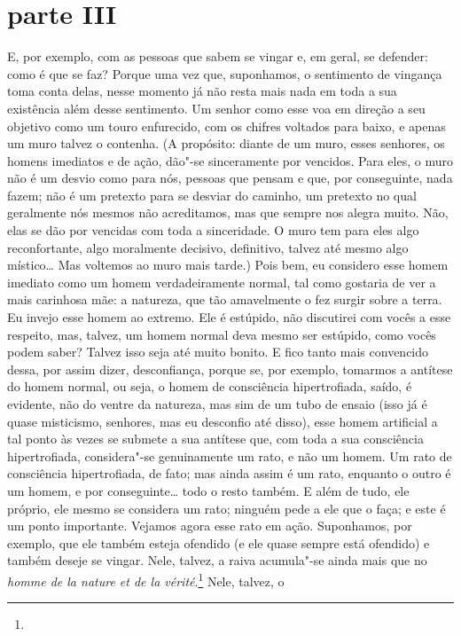 \section{parte III}

E, por exemplo, com as pessoas que sabem se vingar e, em geral, se defender: como
é que se faz? Porque uma vez que, suponhamos, o sentimento de vingança toma
conta delas, nesse momento já não resta mais nada em toda a sua existência além
desse sentimento. Um senhor como esse voa em direção a seu objetivo como um
touro enfurecido, com os chifres voltados para baixo, e apenas um muro talvez o
contenha. (A propósito: diante de um muro, esses senhores, os homens imediatos
e de ação, dão"-se sinceramente por vencidos. Para eles, o muro não é um desvio
como para nós, pessoas que pensam e que, por conseguinte, nada
fazem; não é um pretexto para se desviar do caminho, um pretexto no qual
geralmente nós mesmos não acreditamos, mas que sempre nos alegra muito. Não,
elas se dão por vencidas com toda a sinceridade. O muro tem para eles algo
reconfortante, algo moralmente decisivo, definitivo, talvez até mesmo algo
místico\ldots{} Mas voltemos ao muro mais tarde.) Pois bem, eu considero esse
homem imediato como um homem verdadeiramente normal, tal como gostaria de ver a
mais carinhosa mãe: a natureza, que tão amavelmente o fez surgir sobre a terra.
Eu invejo esse homem ao extremo. Ele é estúpido, não discutirei com vocês a
esse respeito, mas, talvez, um homem normal deva mesmo ser estúpido, como vocês
podem saber? Talvez isso seja até muito bonito. E fico tanto mais convencido
dessa, por assim dizer, desconfiança, porque se, por exemplo, tomarmos a
antítese do homem normal, ou seja, o homem de consciência hipertrofiada, saído,
é evidente, não do ventre da natureza, mas sim de um tubo de ensaio (isso já é
quase misticismo, senhores, mas eu desconfio até disso), esse homem artificial
a tal ponto às vezes se submete a sua antítese que, com toda a sua consciência
hipertrofiada, considera"-se genuinamente um rato, e não um homem. Um rato de
consciência hipertrofiada, de fato; mas ainda assim é um rato, enquanto o outro
é um homem, e por conseguinte\ldots{} todo o resto também. E além de tudo, ele
próprio, ele mesmo se considera um rato; ninguém pede a ele que o faça; e este
é um ponto importante. Vejamos agora esse rato em ação. Suponhamos, por
exemplo, que ele também esteja ofendido (e ele quase sempre está ofendido) e
também deseje se vingar.  Nele, talvez, a raiva acumula"-se ainda mais que no
\textit{homme de la nature et de la vérité}.\footnote{} Nele, talvez, o

